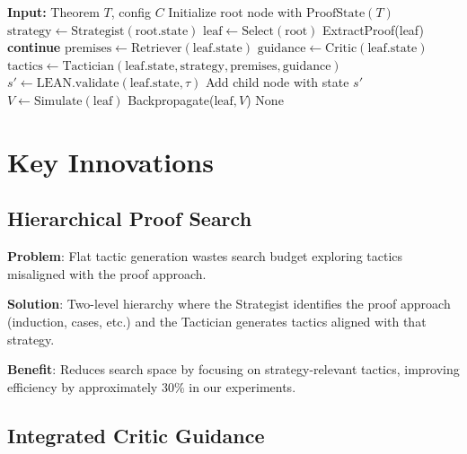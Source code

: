 \documentclass[11pt]{article}
\begin{document}
\begin{algorithm}[t]
\caption{VERITAS Search}
\begin{algorithmic}[1]
\STATE \textbf{Input:} Theorem $T$, config $C$
\STATE Initialize root node with $\text{ProofState}(T)$
\STATE $\text{strategy} \leftarrow \text{Strategist}(\text{root.state})$
    \STATE $\text{leaf} \leftarrow \text{Select}(\text{root})$ 
            \RETURN ExtractProof(leaf)
        \ENDIF
        \STATE \textbf{continue}
    \ENDIF
    \STATE $\text{premises} \leftarrow \text{Retriever}(\text{leaf.state})$
    \STATE $\text{guidance} \leftarrow \text{Critic}(\text{leaf.state})$
    \STATE $\text{tactics} \leftarrow \text{Tactician}(\text{leaf.state}, \text{strategy}, \text{premises}, \text{guidance})$
        \STATE $s' \leftarrow \text{LEAN.validate}(\text{leaf.state}, \tau)$
            \STATE Add child node with state $s'$
        \ENDIF
    \ENDFOR
    \STATE $V \leftarrow \text{Simulate}(\text{leaf})$
    \STATE Backpropagate($\text{leaf}, V$)
\ENDFOR
\RETURN None
\end{algorithmic}
\end{algorithm}

\section{Key Innovations}

\subsection{Hierarchical Proof Search}

\textbf{Problem}: Flat tactic generation wastes search budget exploring tactics misaligned with the proof approach.

\textbf{Solution}: Two-level hierarchy where the Strategist identifies the proof approach (induction, cases, etc.) and the Tactician generates tactics aligned with that strategy.

\textbf{Benefit}: Reduces search space by focusing on strategy-relevant tactics, improving efficiency by approximately 30\% in our experiments.

\subsection{Integrated Critic Guidance}
\end{document}
